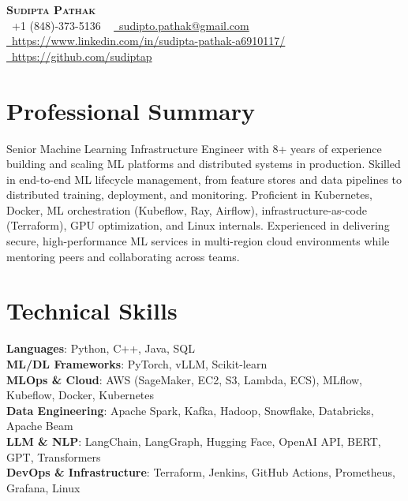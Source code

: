 \documentclass[letterpaper,11pt]{article}
\begin{document}
\begin{center}
    \textbf{\Huge \scshape Sudipta Pathak} \\ \vspace{1pt}
    \small \raisebox{-0.1\height}\faPhone\ +1 (848)-373-5136 ~ 
    \href{mailto:sudipto.pathak@email.com}{\raisebox{-0.2\height}\faEnvelope\ sudipto.pathak@gmail.com} ~ 
    \href{https://www.linkedin.com/in/sudipta-pathak-a6910117/}{\raisebox{-0.2\height}\faLinkedin\ https://www.linkedin.com/in/sudipta-pathak-a6910117/} ~
    \href{https://github.com/sudiptap}{\raisebox{-0.2\height}\faGithub\ https://github.com/sudiptap}
    \vspace{-8pt}
\end{center}

\section{Professional Summary}
\small{Senior Machine Learning Infrastructure Engineer with 8+ years of experience building and scaling ML platforms and distributed systems in production. Skilled in end-to-end ML lifecycle management, from feature stores and data pipelines to distributed training, deployment, and monitoring. Proficient in Kubernetes, Docker, ML orchestration (Kubeflow, Ray, Airflow), infrastructure-as-code (Terraform), GPU optimization, and Linux internals. Experienced in delivering secure, high-performance ML services in multi-region cloud environments while mentoring peers and collaborating across teams.}

\section{Technical Skills}
\begin{itemize}[leftmargin=0.15in, label={}]
    \small{\item{
     \textbf{Languages}{: Python, C++, Java, SQL} \\
     \textbf{ML/DL Frameworks}{: PyTorch, vLLM, Scikit-learn} \\
     \textbf{MLOps \& Cloud}{: AWS (SageMaker, EC2, S3, Lambda, ECS), MLflow, Kubeflow, Docker, Kubernetes} \\
     \textbf{Data Engineering}{: Apache Spark, Kafka, Hadoop, Snowflake, Databricks, Apache Beam} \\
     \textbf{LLM \& NLP}{: LangChain, LangGraph, Hugging Face, OpenAI API, BERT, GPT, Transformers} \\
     \textbf{DevOps \& Infrastructure}{: Terraform, Jenkins, GitHub Actions, Prometheus, Grafana, Linux} \\
    }}
 \end{itemize}
\end{document}
